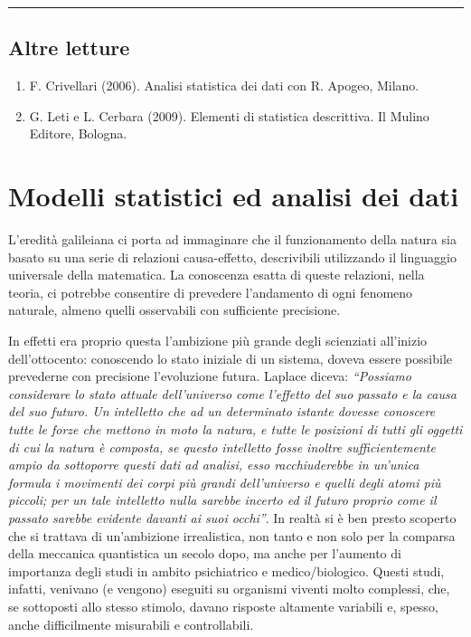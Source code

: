 \documentclass[a4paper,12pt,oneside]{book}
\providecommand{\tightlist}{%
  \setlength{\itemsep}{0pt}\setlength{\parskip}{0pt}}
\begin{document}
\begin{center}\rule{0.5\linewidth}{0.5pt}\end{center}

\hypertarget{altre-letture-2}{%
\section{Altre letture}\label{altre-letture-2}}

\begin{enumerate}
\def\labelenumi{\arabic{enumi}.}
\tightlist
\item
  F. Crivellari (2006). Analisi statistica dei dati con R. Apogeo, Milano.
\item
  G. Leti e L. Cerbara (2009). Elementi di statistica descrittiva. Il Mulino Editore, Bologna.
\end{enumerate}

\hypertarget{modelli-statistici-ed-analisi-dei-dati}{%
\chapter{Modelli statistici ed analisi dei dati}\label{modelli-statistici-ed-analisi-dei-dati}}

L'eredità galileiana ci porta ad immaginare che il funzionamento della natura sia basato su una serie di relazioni causa-effetto, descrivibili utilizzando il linguaggio universale della matematica. La conoscenza esatta di queste relazioni, nella teoria, ci potrebbe consentire di prevedere l'andamento di ogni fenomeno naturale, almeno quelli osservabili con sufficiente precisione.

In effetti era proprio questa l'ambizione più grande degli scienziati all'inizio dell'ottocento: conoscendo lo stato iniziale di un sistema, doveva essere possibile prevederne con precisione l'evoluzione futura. Laplace diceva: \emph{``Possiamo considerare lo stato attuale dell'universo come l'effetto del suo passato e la causa del suo futuro. Un intelletto che ad un determinato istante dovesse conoscere tutte le forze che mettono in moto la natura, e tutte le posizioni di tutti gli oggetti di cui la natura è composta, se questo intelletto fosse inoltre sufficientemente ampio da sottoporre questi dati ad analisi, esso racchiuderebbe in un'unica formula i movimenti dei corpi più grandi dell'universo e quelli degli atomi più piccoli; per un tale intelletto nulla sarebbe incerto ed il futuro proprio come il passato sarebbe evidente davanti ai suoi occhi''}. In realtà si è ben presto scoperto che si trattava di un'ambizione irrealistica, non tanto e non solo per la comparsa della meccanica quantistica un secolo dopo, ma anche per l'aumento di importanza degli studi in ambito psichiatrico e medico/biologico. Questi studi, infatti, venivano (e vengono) eseguiti su organismi viventi molto complessi, che, se sottoposti allo stesso stimolo, davano risposte altamente variabili e, spesso, anche difficilmente misurabili e controllabili.
\end{document}
